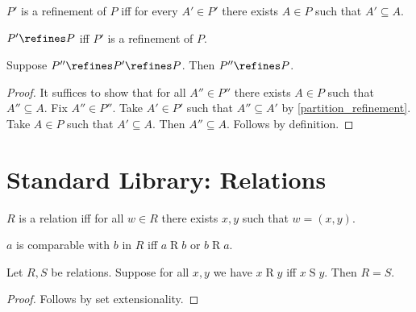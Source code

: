 \begin{definition}\label{partition_refinement}
    $P'$ is a refinement of $P$ iff
    for every $A'\in P'$ there exists
    $A\in P$ such that $A'\subseteq A$.
\end{definition}

\begin{abbreviation}\label{partition_refines}
    $P'\refines P$ iff
    $P'$ is a refinement of $P$.
\end{abbreviation}

\begin{proposition}\label{partition_refinement_transitive}
    Suppose $P''\refines P'\refines P$.
    Then $P''\refines P$.
\end{proposition}
\begin{proof}
    It suffices to show that for all $A''\in P''$ there exists $A\in P$ such that $A''\subseteq A$.
    Fix $A''\in P''$.
    Take $A'\in P'$ such that $A''\subseteq A'$
        by \cref{partition_refinement}.
    Take $A\in P$ such that $A'\subseteq A$.
    Then $A''\subseteq A$.
    Follows by definition. %
\end{proof}


\section{Standard Library: Relations}

\begin{definition}\label{relation}
    $R$ is a relation iff
    for all $w\in R$ there exists $x, y$ such that $w = (x, y)$.
\end{definition}

\begin{definition}\label{comparable}
    $a$ is comparable with $b$ in $R$ iff $a\mathrel{R}b$ or $b\mathrel{R}a$.
\end{definition}

\begin{proposition}\label{relext}
    Let $R, S$ be relations.
    Suppose for all $x,y$ we have $x\mathrel{R} y$ iff $x\mathrel{S} y$.
    Then $R = S$.
\end{proposition}
\begin{proof}
    Follows by set extensionality.
\end{proof}

